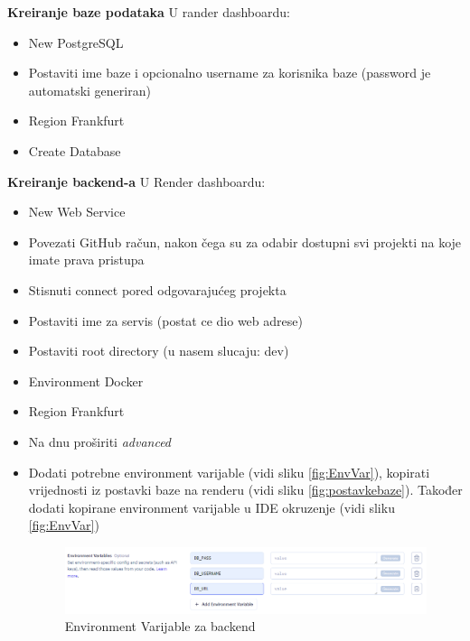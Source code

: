 				\begin{packed_enum}
				\item \textbf{Kreiranje baze podataka}
				U rander dashboardu:
				\begin{itemize}
					\item New \textrightarrow PostgreSQL
					\item Postaviti ime baze i opcionalno username za korisnika baze (password je automatski generiran)
					\item Region Frankfurt
					\item Create Database
				\end{itemize}
				
				\item \textbf{Kreiranje backend-a}
				U Render dashboardu:
				\begin{itemize}
					\item New \textrightarrow Web Service
					\item Povezati GitHub račun, nakon čega su za odabir dostupni svi projekti na koje imate prava pristupa
					\item Stisnuti connect pored odgovarajućeg projekta
					\item Postaviti ime za servis (postat ce dio web adrese)
					\item Postaviti root directory (u nasem slucaju: dev)
					\item Environment Docker
					\item Region Frankfurt
					\item Na dnu proširiti \textit{advanced}
					\item Dodati potrebne environment varijable (vidi sliku \ref{fig:EnvVar}), kopirati vrijednosti iz postavki baze na renderu (vidi sliku \ref{fig:postavkebaze}). Također dodati kopirane environment varijable u IDE okruzenje (vidi sliku \ref{fig:EnvVar})
					
					\begin{figure}[H]
						\includegraphics[scale=0.5]{slike/EnvironmentVarijableBackend}
						\centering
						\caption{Environment Varijable za backend}
						\label{fig:EnvVarbackend}
					\end{figure}
					

\end{itemize}
\end{packed_enum}
